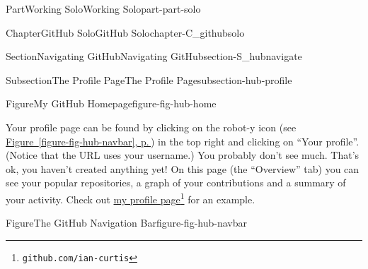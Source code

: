 \documentclass[twoside,10pt,]{book}
\newcommand{\xreffont}{\relax}
\begin{document}
\begin{partptx}{Part}{Working Solo}{}{Working Solo}{}{}{part-part-solo}
\begin{chapterptx}{Chapter}{GitHub Solo}{}{GitHub Solo}{}{}{chapter-C_githubsolo}
\begin{sectionptx}{Section}{Navigating GitHub}{}{Navigating GitHub}{}{}{section-S_hubnavigate}
\begin{subsectionptx}{Subsection}{The Profile Page}{}{The Profile Page}{}{}{subsection-hub-profile}
\begin{figureptx}{Figure}{My GitHub Homepage}{figure-fig-hub-home}{}
\begin{image}{0.05}{0.9}{0.05}{}
\end{image}%
\tcblower
\end{figureptx}%
Your profile page can be found by clicking on the robot-y icon (see \hyperref[figure-fig-hub-navbar]{Figure~{\xreffont\ref{figure-fig-hub-navbar}}, p.\,\pageref{figure-fig-hub-navbar}}) in the top right and clicking on ``Your profile''. (Notice that the URL uses your username.) You probably don't see much. That's ok, you haven't created anything yet! On this page (the ``Overview'' tab) you can see your popular repositories, a graph of your contributions and a summary of your activity. Check out \href{https://github.com/ian-curtis}{my profile page}\footnote{\nolinkurl{github.com/ian-curtis}\label{fn-hub-profile-i-e}} for an example.%
\begin{figureptx}{Figure}{The GitHub Navigation Bar}{figure-fig-hub-navbar}{}%
\begin{image}{0.35}{0.3}{0.35}{}%

\end{image}
\end{figureptx}
\end{subsectionptx}
\end{sectionptx}
\end{chapterptx}
\end{partptx}
\end{document}
